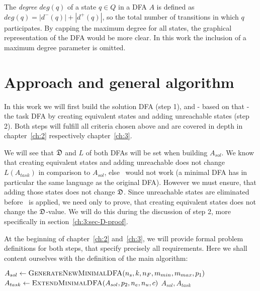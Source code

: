 The \emph{degree} $deg(q)$ of a state $q \in Q$ in a DFA $A$ is defined as $deg(q) = |d^-(q)| + |d^+(q)|$, so the total number of transitions in which $q$ participates. By capping the maximum degree for all states, the graphical representation of the DFA would be more clear. In this work the inclusion of a maximum degree parameter is omitted.


\section{Approach and general algorithm}

In this work we will first build the solution DFA (step 1), and - based on that - the task DFA by creating equivalent states and adding unreachable states (step 2). Both steps will fulfill all criteria chosen above and are covered in depth in chapter~\ref{ch:2} respectively chapter~\ref{ch:3}.

We will see that $\mathfrak{D}$ and $L$ of both DFAs will be set when building $A_{sol}$. We know that creating equivalent states and adding unreachable does not change $L(A_{task})$ in comparison to $A_{sol}$, else \MinAlg\ would not work (a minimal DFA has in particular the same language as the original DFA). However we must ensure, that adding those states does not change $\mathfrak{D}$. Since unreachable states are eliminated before \CompDist\ is applied, we need only to prove, that creating equivalent states does not change the $\mathfrak{D}$-value. We will do this during the discussion of step 2, more specifically in section~\ref{ch:3:sec-D-proof}.

At the beginning of chapter~\ref{ch:2} and~\ref{ch:3}, we will provide formal problem definitions for both steps, that specify precisely all requirements. Here we shall content ourselves with the definition of the main algorithm:
\vspace{0.2cm}
\begin{algorithmic}[1]
	\State $A_{sol} \gets \textsc{GenerateNewMinimalDFA}({n_s}, k, {n_F}, m_{min}, m_{max}, p_1)$
	\State $A_{task} \gets \textsc{ExtendMinimalDFA}(A_{sol}, p_2, {n_e},{n_u}, c)$
	\State \Return $A_{sol}, A_{task}$
	\EndFunction
\end{algorithmic}


